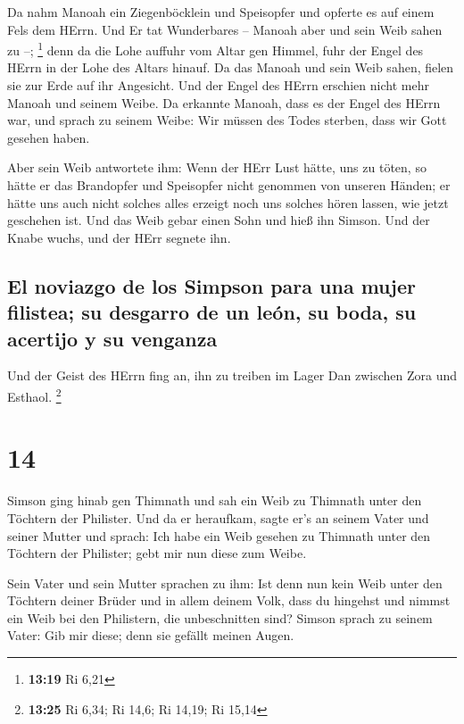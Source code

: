  Da nahm Manoah ein Ziegenböcklein und Speisopfer und
opferte es auf einem Fels dem HErrn. Und Er tat Wunderbares -- Manoah
aber und sein Weib sahen zu --; \footnote{\textbf{13:19} Ri 6,21}
 denn da die Lohe auffuhr vom Altar gen Himmel, fuhr der
Engel des HErrn in der Lohe des Altars hinauf. Da das Manoah und sein
Weib sahen, fielen sie zur Erde auf ihr Angesicht.  Und
der Engel des HErrn erschien nicht mehr Manoah und seinem Weibe. Da
erkannte Manoah, dass es der Engel des HErrn war,  und
sprach zu seinem Weibe: Wir müssen des Todes sterben, dass wir Gott
gesehen haben.

 Aber sein Weib antwortete ihm: Wenn der HErr Lust hätte,
uns zu töten, so hätte er das Brandopfer und Speisopfer nicht genommen
von unseren Händen; er hätte uns auch nicht solches alles erzeigt noch
uns solches hören lassen, wie jetzt geschehen ist.  Und
das Weib gebar einen Sohn und hieß ihn Simson. Und der Knabe wuchs, und
der HErr segnete ihn.

\hypertarget{el-noviazgo-de-los-simpson-para-una-mujer-filistea-su-desgarro-de-un-leuxf3n-su-boda-su-acertijo-y-su-venganza}{%
\subsection{El noviazgo de los Simpson para una mujer filistea; su
desgarro de un león, su boda, su acertijo y su
venganza}\label{el-noviazgo-de-los-simpson-para-una-mujer-filistea-su-desgarro-de-un-leuxf3n-su-boda-su-acertijo-y-su-venganza}}

 Und der Geist des HErrn fing an, ihn zu treiben im Lager
Dan zwischen Zora und Esthaol. \footnote{\textbf{13:25} Ri 6,34; Ri
  14,6; Ri 14,19; Ri 15,14}

\hypertarget{section-13}{%
\section{14}\label{section-13}}

 Simson ging hinab gen Thimnath und sah ein Weib zu
Thimnath unter den Töchtern der Philister.  Und da er
heraufkam, sagte er's an seinem Vater und seiner Mutter und sprach: Ich
habe ein Weib gesehen zu Thimnath unter den Töchtern der Philister; gebt
mir nun diese zum Weibe.

 Sein Vater und sein Mutter sprachen zu ihm: Ist denn nun
kein Weib unter den Töchtern deiner Brüder und in allem deinem Volk,
dass du hingehst und nimmst ein Weib bei den Philistern, die
unbeschnitten sind? Simson sprach zu seinem Vater: Gib mir diese; denn
sie gefällt meinen Augen.

